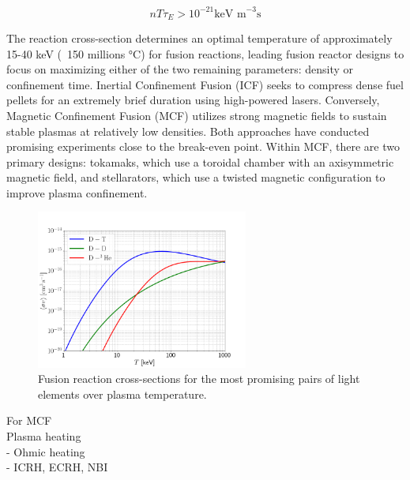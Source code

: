 \begin{equation}
	\label{eq:LawsonCriterionDT}
	nT\tau_E > 10^{-21} \text{keV m}^{-3}\text{s}
\end{equation}

The reaction cross-section determines an optimal temperature of approximately 15-40 keV  (~150 millions °C) for fusion reactions, leading fusion reactor designs to focus on maximizing either of the two remaining parameters: density or confinement time. Inertial Confinement Fusion (ICF) seeks to compress dense fuel pellets for an extremely brief duration using high-powered lasers. Conversely, Magnetic Confinement Fusion (MCF) utilizes strong magnetic fields to sustain stable plasmas at relatively low densities. Both approaches have conducted promising experiments close to the break-even point. Within MCF, there are two primary designs: tokamaks, which use a toroidal chamber with an axisymmetric magnetic field, and stellarators, which use a twisted magnetic configuration to improve plasma confinement. \newline

\begin{figure}[H]
	\centering
	\includegraphics[width=0.62\textwidth]{schemes/fusion-reactivities.png}
	\caption{Fusion reaction cross-sections for the most promising pairs of light elements over plasma temperature.}
	\label{fig:Intro_fusionCrossSections}
\end{figure}


For MCF \\
Plasma heating \\ 
- Ohmic heating \\ 
- ICRH, ECRH, NBI \\

